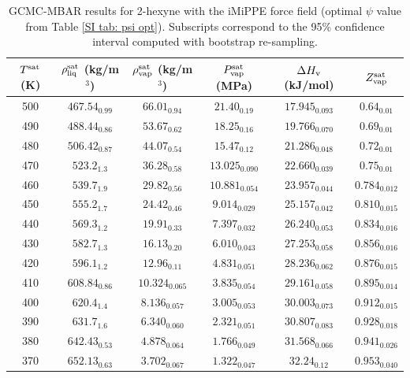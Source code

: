 \documentclass[journal=jctc,manuscript=article]{achemso}
\begin{document}
\begin{table}[htb!]
	\caption{GCMC-MBAR results for 2-hexyne with the iMiPPE force field (optimal $\psi$ value from Table \ref{SI tab: psi opt}). Subscripts correspond to the 95\% confidence interval computed with bootstrap re-sampling.}
	\begin{center}
		\begin{tabular}{|c|c|c|c|c|c|}
			\hline
			$T^{\rm sat}$ (K) & $\rho_{\rm liq}^{\rm sat}$ (kg/m$^3$) & $\rho_{\rm vap}^{\rm sat}$ (kg/m$^3$) & $P_{\rm vap}^{\rm sat}$ (MPa) & $\Delta H_{\rm v}$ (kJ/mol) & $Z_{\rm vap}^{\rm sat}$ \\ \hline
			500 & $467.54_{0.99}$ & $66.01_{0.94}$ & $21.40_{0.19}$ & $17.945_{0.093}$ & $0.64_{0.01}$ \\
			490 & $488.44_{0.86}$ & $53.67_{0.62}$ & $18.25_{0.16}$ & $19.766_{0.070}$ & $0.69_{0.01}$ \\
			480 & $506.42_{0.87}$ & $44.07_{0.54}$ & $15.47_{0.12}$ & $21.286_{0.048}$ & $0.72_{0.01}$ \\
			470 & $523.2_{1.3}$ & $36.28_{0.58}$ & $13.025_{0.090}$ & $22.660_{0.039}$ & $0.75_{0.01}$ \\
			460 & $539.7_{1.9}$ & $29.82_{0.56}$ & $10.881_{0.054}$ & $23.957_{0.044}$ & $0.784_{0.012}$ \\
			450 & $555.2_{1.7}$ & $24.42_{0.46}$ & $9.014_{0.029}$ & $25.157_{0.042}$ & $0.810_{0.015}$ \\
			440 & $569.3_{1.2}$ & $19.91_{0.33}$ & $7.397_{0.032}$ & $26.240_{0.053}$ & $0.834_{0.016}$ \\
			430 & $582.7_{1.3}$ & $16.13_{0.20}$ & $6.010_{0.043}$ & $27.253_{0.058}$ & $0.856_{0.016}$ \\
			420 & $596.1_{1.2}$ & $12.96_{0.11}$ & $4.831_{0.051}$ & $28.236_{0.062}$ & $0.876_{0.015}$ \\
			410 & $608.84_{0.86}$ & $10.324_{0.065}$ & $3.835_{0.054}$ & $29.161_{0.058}$ & $0.895_{0.014}$ \\
			400 & $620.4_{1.4}$ & $8.136_{0.057}$ & $3.005_{0.053}$ & $30.003_{0.073}$ & $0.912_{0.015}$ \\
			390 & $631.7_{1.6}$ & $6.340_{0.060}$ & $2.321_{0.051}$ & $30.807_{0.083}$ & $0.928_{0.018}$ \\
			380 & $642.43_{0.53}$ & $4.878_{0.064}$ & $1.766_{0.049}$ & $31.568_{0.066}$ & $0.941_{0.026}$ \\
			370 & $652.13_{0.63}$ & $3.702_{0.067}$ & $1.322_{0.047}$ & $32.24_{0.12}$ & $0.953_{0.040}$ \\
			\hline
		\end{tabular}
	\end{center}
\end{table}
\end{document}
